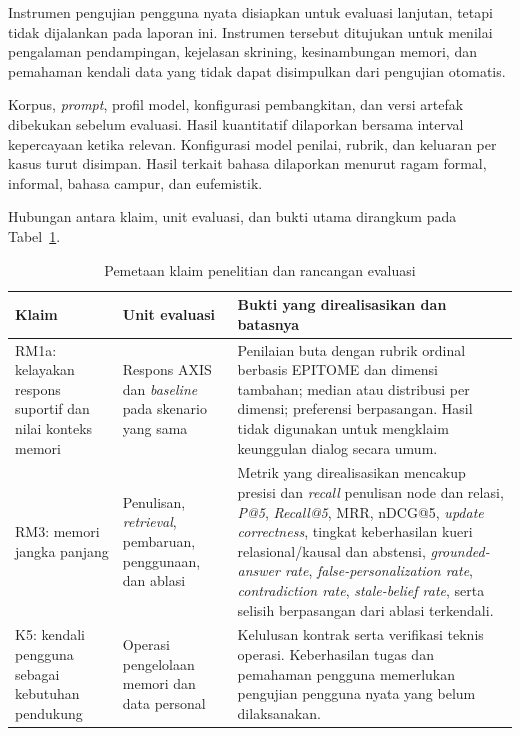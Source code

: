 Instrumen pengujian pengguna nyata disiapkan untuk evaluasi lanjutan, tetapi tidak dijalankan pada laporan ini. Instrumen tersebut ditujukan untuk menilai pengalaman pendampingan, kejelasan skrining, kesinambungan memori, dan pemahaman kendali data yang tidak dapat disimpulkan dari pengujian otomatis.

Korpus, \textit{prompt}, profil model, konfigurasi pembangkitan, dan versi artefak dibekukan sebelum evaluasi. Hasil kuantitatif dilaporkan bersama interval kepercayaan ketika relevan. Konfigurasi model penilai, rubrik, dan keluaran per kasus turut disimpan. Hasil terkait bahasa dilaporkan menurut ragam formal, informal, bahasa campur, dan eufemistik.

Hubungan antara klaim, unit evaluasi, dan bukti utama dirangkum pada Tabel~\ref{tab:pemetaan-rumusan-rancangan}.

\begin{table}[!htbp]
\centering
\caption{Pemetaan klaim penelitian dan rancangan evaluasi}
\label{tab:pemetaan-rumusan-rancangan}
{\footnotesize
\begin{tabularx}{\textwidth}{|>{\raggedright\arraybackslash}p{2.3cm}|>{\raggedright\arraybackslash}p{3.2cm}|>{\raggedright\arraybackslash}X|}
\hline
\rowcolor{tableheadgray}
\textbf{Klaim} & \textbf{Unit evaluasi} & \textbf{Bukti yang direalisasikan dan batasnya} \\
\hline
RM1a: kelayakan respons suportif dan nilai konteks memori & Respons AXIS dan \textit{baseline} pada skenario yang sama & Penilaian buta dengan rubrik ordinal berbasis EPITOME dan dimensi tambahan; median atau distribusi per dimensi; preferensi berpasangan. Hasil tidak digunakan untuk mengklaim keunggulan dialog secara umum. \\
\hline
RM3: memori jangka panjang & Penulisan, \textit{retrieval}, pembaruan, penggunaan, dan ablasi & Metrik yang direalisasikan mencakup presisi dan \textit{recall} penulisan node dan relasi, \textit{P@5}, \textit{Recall@5}, MRR, nDCG@5, \textit{update correctness}, tingkat keberhasilan kueri relasional/kausal dan abstensi, \textit{grounded-answer rate}, \textit{false-personalization rate}, \textit{contradiction rate}, \textit{stale-belief rate}, serta selisih berpasangan dari ablasi terkendali. \\
\hline
K5: kendali pengguna sebagai kebutuhan pendukung & Operasi pengelolaan memori dan data personal & Kelulusan kontrak serta verifikasi teknis operasi. Keberhasilan tugas dan pemahaman pengguna memerlukan pengujian pengguna nyata yang belum dilaksanakan. \\
\hline
\end{tabularx}
}
\end{table}